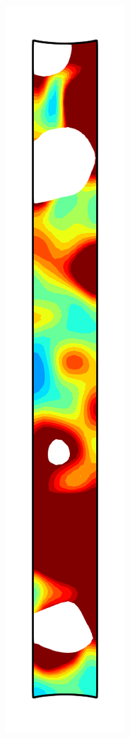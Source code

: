 \begin{figure}[!htb]
\begin{subfigure}{0.08\textwidth}
  \end{subfigure}
  \begin{subfigure}{0.08\textwidth}
    \centering
    \includegraphics[width=\textwidth]{Chapter5/figures/spallation/ep_9}

\end{subfigure}
\end{figure}
